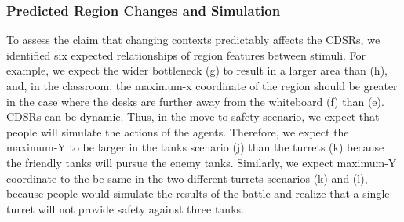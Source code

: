 \documentclass[11pt,letterpaper]{article}
\begin{document}

\subsubsection{Predicted Region Changes and Simulation}
\label{sec:simulation}
To assess the claim that changing contexts predictably affects the CDSRs, we identified six expected relationships of region features between stimuli.  For example, we expect the wider bottleneck (g) to result in a larger area than (h), and, in the classroom, the maximum-x coordinate of the region should be greater in the case where the desks are further away from the whiteboard (f) than (e).  CDSRs can be dynamic. Thus, in the move to safety scenario, we expect that people will simulate the actions of the agents.  Therefore, we expect the maximum-Y to be larger in the tanks scenario (j) than the turrets (k) because the friendly tanks will pursue the enemy tanks.  Similarly, we expect maximum-Y coordinate to the be same in the two different turrets scenarios (k) and (l), because people would simulate the results of the battle and realize that a single turret will not provide safety against three tanks.  
\end{document}
